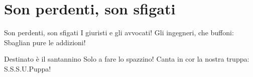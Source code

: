\section{Son perdenti, son sfigati}
\subtitle{Sul canto tipico dei marines}

\subtitle{Ogni verso si canta due volte, tranne gli ultimi due}
\begin{canzone}
Son perdenti, son sfigati
I giuristi e gli avvocati!
Gli ingegneri, che buffoni:
Sbaglian pure le addizioni!

Destinato è il santannino
Solo a fare lo spazzino!
Canta in cor la nostra truppa:
S.S.S.U.Puppa!
\end{canzone}
